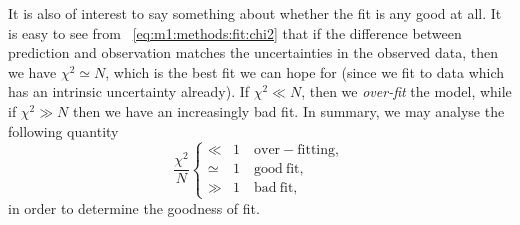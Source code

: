     It is also of interest to say something about whether the fit is any good at all. It is easy to see from ~\cref{eq:m1:methods:fit:chi2} that if the difference between prediction and observation matches the uncertainties in the observed data, then we have $\chi^2 \simeq N$, which is the best fit we can hope for (since we fit to data which has an intrinsic uncertainty already). If $\chi^2\ll N$, then we \textit{over-fit} the model, while if $\chi^2\gg N$ then we have an increasingly bad fit. In summary, we may analyse the following quantity
    \begin{equation}\label{eq:m1:goodness_of_fit}
        \frac{\chi^2}{N} \begin{cases}
            \ll &1 \quad \mathrm{over-fitting,} \\
            \simeq &1 \quad \mathrm{good\ fit,}\\
            \gg &1 \quad \mathrm{bad\ fit,}
        \end{cases}
    \end{equation}
    in order to determine the goodness of fit. 


    
